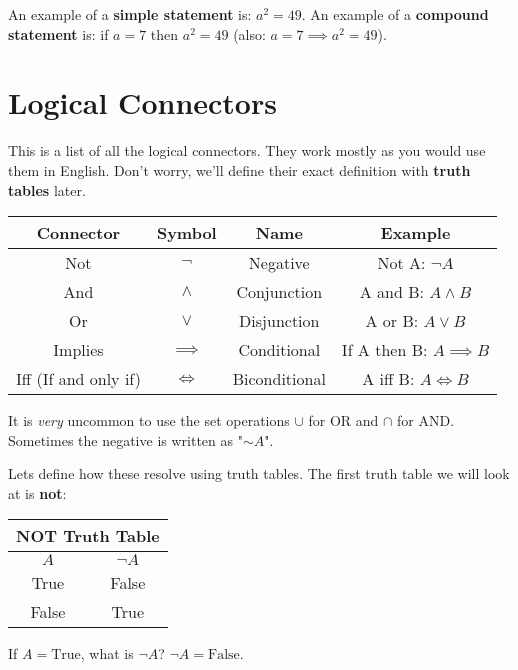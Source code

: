 \begin{boxexample}{}{}
	An example of a {\bf simple statement} is: $a^2=49$. An example of a {\bf compound statement} is: if $a=7$ then $a^2=49$ (also: $a=7 \implies a^2=49$). 
\end{boxexample}

\section{Logical Connectors}

This is a list of all the logical connectors. They work mostly as you would use them in English. Don't worry, we'll define their exact definition with {\bf truth tables} later.

\begin{tabular}{c|c|c|c}
	\hline
	Connector & Symbol & Name & Example\\
	\hline
	Not & $\neg$ & Negative & Not A: $\neg A$\\
	And & $\land$ & Conjunction & A and B: $A \land B$\\
	Or & $\lor$ & Disjunction & A or B: $A \lor B$\\
	Implies & $\implies$ & Conditional & If A then B: $A \implies B$\\
	Iff (If and only if) & $\iff$ & Biconditional & A iff B: $A \iff B$\\
\hline
\end{tabular}

\begin{boxremark*}{}{}
	It is \emph{very} uncommon to use the set operations $\cup$ for OR and $\cap$ for AND. Sometimes the negative is written as "$\sim A$".
\end{boxremark*}

Lets define how these resolve using truth tables. The first truth table we will look at is {\bf not}:

\begin{tabular}{c|c}
	\hline
	\multicolumn{2}{c}{NOT Truth Table}\\
	\hline
	$A$ & $\neg A$\\
	\hline
	True & False\\
	False & True\\
	\hline
\end{tabular}

\begin{boxexample}{}{}
	If $A=\text{True}$, what is $\neg A$? $\neg A=\text{False}$.
\end{boxexample}

